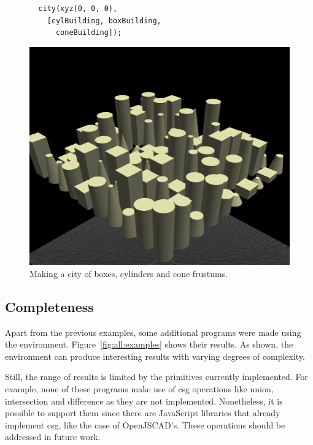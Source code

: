 \begin{figure}
\begin{minipage}{0.5\textwidth}
\begin{verbatim}
  city(xyz(0, 0, 0),
    [cylBuilding, boxBuilding,
      coneBuilding]);
\end{verbatim}
\end{minipage}%
\begin{minipage}{0.5\textwidth}
  \includegraphics[width=1.0\textwidth]{./images/detail_examples/box_cyl_city_higher_crop}
\end{minipage}
\caption{Making a city of boxes, cylinders and cone frustums.}
\label{fig:cyl:box:cone:city}
\end{figure}


\subsection{Completeness}
Apart from the previous examples, some additional programs were made using the environment.
Figure~\ref{fig:all:examples} shows their results.
As shown, the environment can produce interesting results with varying degrees of complexity.

Still, the range of results is limited by the primitives currently implemented.
For example, none of these programs make use of \gls{csg} operations like union, intersection and difference as they are not implemented.
Nonetheless, it is possible to support them since there are JavaScript libraries that already implement \gls{csg}, like the case of OpenJSCAD's.
These operations should be addressed in future work.

